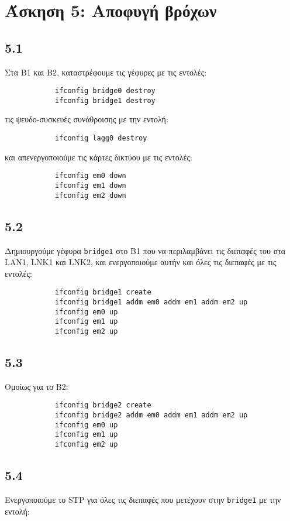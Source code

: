\documentclass[a4paper, 12pt]{article}
\begin{document}
\section*{Άσκηση 5: Αποφυγή βρόχων}

	\subsection*{5.1}
		Στα B1 και B2, καταστρέφουμε τις γέφυρες με τις εντολές:
		
		\begin{verbatim}
			ifconfig bridge0 destroy
			ifconfig bridge1 destroy
		\end{verbatim} 
		
		τις ψευδο-συσκευές συνάθροισης με την εντολή:
		
		\begin{verbatim}
			ifconfig lagg0 destroy
		\end{verbatim}

		και απενεργοποιούμε τις κάρτες δικτύου με τις εντολές:
		
		\begin{verbatim}
			ifconfig em0 down
			ifconfig em1 down
			ifconfig em2 down
		\end{verbatim} 
	
	\subsection*{5.2}
		Δημιουργούμε γέφυρα \verb|bridge1| στο B1 που να περιλαμβάνει τις διεπαφές του στα LAN1, LNK1 και LNK2, και ενεργοποιούμε αυτήν και όλες τις διεπαφές με τις εντολές: 
		
		\begin{verbatim}
			ifconfig bridge1 create
			ifconfig bridge1 addm em0 addm em1 addm em2 up
			ifconfig em0 up
			ifconfig em1 up
			ifconfig em2 up
		\end{verbatim}

	\subsection*{5.3}
		Ομοίως για το B2:
		
		\begin{verbatim}
			ifconfig bridge2 create
			ifconfig bridge2 addm em0 addm em1 addm em2 up
			ifconfig em0 up
			ifconfig em1 up
			ifconfig em2 up
		\end{verbatim}

	\subsection*{5.4}
		Ενεργοποιούμε το STP για όλες τις διεπαφές που μετέχουν στην \verb|bridge1| με την εντολή:
		
\end{document}
